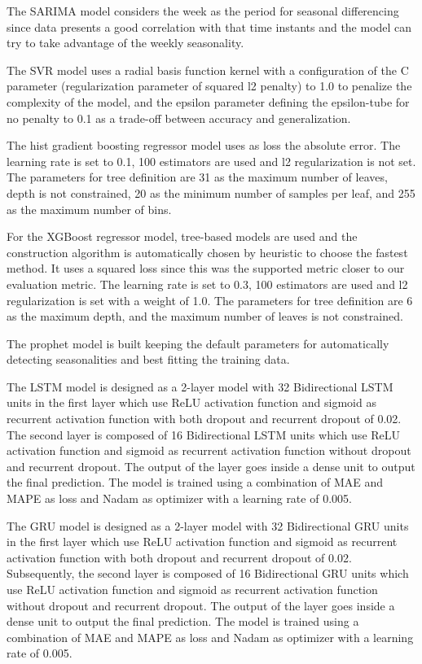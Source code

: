 The SARIMA model considers the week as the period for seasonal differencing since data presents a good correlation with that time instants and the model can try to take advantage of the weekly seasonality.

The SVR model uses a radial basis function kernel with a configuration of the C parameter (regularization parameter of squared l2 penalty) to 1.0 to penalize the complexity of the model, and the epsilon parameter defining the epsilon-tube for no penalty to 0.1 as a trade-off between accuracy and generalization.

The hist gradient boosting regressor model uses as loss the absolute error.
The learning rate is set to 0.1, 100 estimators are used and l2 regularization is not set.
The parameters for tree definition are 31 as the maximum number of leaves, depth is not constrained, 20 as the minimum number of samples per leaf, and 255 as the maximum number of bins.

For the XGBoost regressor model, tree-based models are used and the construction algorithm is automatically chosen by heuristic to choose the fastest method.
It uses a squared loss since this was the supported metric closer to our evaluation metric.
The learning rate is set to 0.3, 100 estimators are used and l2 regularization is set with a weight of 1.0.
The parameters for tree definition are 6 as the maximum depth, and the maximum number of leaves is not constrained.

The prophet model is built keeping the default parameters for automatically detecting seasonalities and best fitting the training data.

The LSTM model is designed as a 2-layer model with 32 Bidirectional LSTM units in the first layer which use ReLU activation function and sigmoid as recurrent activation function with both dropout and recurrent dropout of 0.02.
The second layer is composed of 16 Bidirectional LSTM units which use ReLU activation function and sigmoid as recurrent activation function without dropout and recurrent dropout.
The output of the layer goes inside a dense unit to output the final prediction.
The model is trained using a combination of MAE and MAPE as loss and Nadam as optimizer with a learning rate of 0.005.

The GRU model is designed as a 2-layer model with 32 Bidirectional GRU units in the first layer which use ReLU activation function and sigmoid as recurrent activation function with both dropout and recurrent dropout of 0.02.
Subsequently, the second layer is composed of 16 Bidirectional GRU units which use ReLU activation function and sigmoid as recurrent activation function without dropout and recurrent dropout.
The output of the layer goes inside a dense unit to output the final prediction.
The model is trained using a combination of MAE and MAPE as loss and Nadam as optimizer with a learning rate of 0.005.

